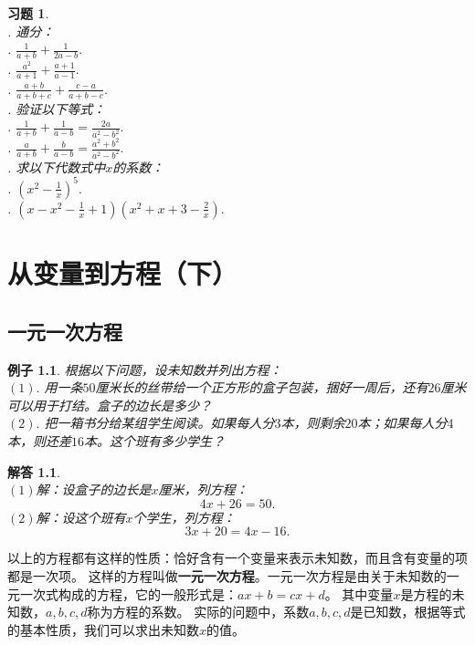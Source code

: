\documentclass[12pt,UTF8]{ctexbook}
\newtheorem{ex}{例子}[section]
\newtheorem*{so}{解答}
\newtheorem{xt}{习题}[section]
\begin{document}
\begin{xt}\label{xt:5-1-0}
    \mbox{}\\
    . 通分：\\
    . $\frac{1}{a+b} + \frac{1}{2a-b}.$\\  %
    . $\frac{a^2}{a+1} + \frac{a+1}{a-1}.$\\  %
    . $\frac{a+b}{a+b+c} + \frac{c-a}{a+b-c}.$\\  %
    . 验证以下等式：\\
    . $\frac{1}{a+b} + \frac{1}{a-b} = \frac{2a}{a^2-b^2}.$\\
    . $\frac{a}{a+b} + \frac{b}{a-b} = \frac{a^2+b^2}{a^2-b^2}.$\\
    . 求以下代数式中$x$的系数：\\
    . $(x^2 - \frac{1}{x})^5.$\\  %
    . $(x - x^2 - \frac{1}{x} + 1)(x^2 + x + 3 - \frac{2}{x}).$ %
\end{xt}

\chapter{从变量到方程（下）}

\section{一元一次方程}

\begin{ex}\label{ex:4-0-0}
    根据以下问题，设未知数并列出方程：\\
    $(1).$ 用一条$50$厘米长的丝带给一个正方形的盒子包装，捆好一周后，还有$26$厘米可以用于打结。盒子的边长是多少？\\
    $(2).$ 把一箱书分给某组学生阅读。如果每人分$3$本，则剩余$20$本；如果每人分$4$本，则还差$16$本。这个班有多少学生？
\end{ex}
\begin{so}
    \mbox{} \\
    $(1)$解：设盒子的边长是$x$厘米，列方程：
    $$ 4x + 26 = 50.$$
    $(2)$解：设这个班有$x$个学生，列方程：
    $$ 3x + 20 = 4x - 16.$$
\end{so}
以上的方程都有这样的性质：恰好含有一个变量来表示未知数，而且含有变量的项都是一次项。
这样的方程叫做\textbf{一元一次方程}。一元一次方程是由关于未知数的一元一次式构成的方程，它的一般形式是：$ax+b=cx+d$。
其中变量$x$是方程的未知数，$a,b,c,d$称为方程的系数。
实际的问题中，系数$a,b,c,d$是已知数，根据等式的基本性质，我们可以求出未知数$x$的值。
\end{document}
